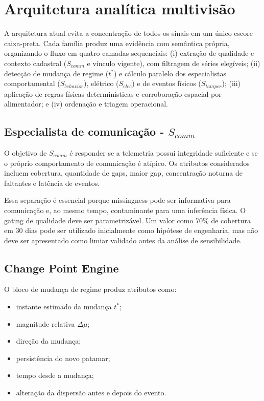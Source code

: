 \chapter{Arquitetura analítica multivisão}\label{arquitetura-analuxedtica-multivisuxe3o}

A arquitetura atual evita a concentração de todos os sinais em um único escore caixa-preta. Cada família produz uma evidência com semântica própria, organizando o fluxo em quatro camadas sequenciais: (i) extração de qualidade e contexto cadastral ($S_{comm}$ e vínculo vigente), com filtragem de séries elegíveis; (ii) detecção de mudança de regime ($t^*$) e cálculo paralelo dos especialistas comportamental ($S_{behavior}$), elétrico ($S_{elec}$) e de eventos físicos ($S_{tamper}$); (iii) aplicação de regras físicas determinísticas e corroboração espacial por alimentador; e (iv) ordenação e triagem operacional.

\section{\texorpdfstring{Especialista de comunicação - \(S_{comm}\)}{Especialista de comunicação - S\_\{comm\}}}\label{especialista-de-comunicauxe7uxe3o---s_comm}

O objetivo de \(S_{comm}\) é responder se a telemetria possui integridade suficiente e se o próprio comportamento de comunicação é atípico. Os atributos considerados incluem cobertura, quantidade de gaps, maior gap, concentração noturna de faltantes e latência de eventos.

Essa separação é essencial porque missingness pode ser informativa para comunicação e, ao mesmo tempo, contaminante para uma inferência física. O gating de qualidade deve ser parametrizável. Um valor como 70\% de cobertura em 30 dias pode ser utilizado inicialmente como hipótese de engenharia, mas não deve ser apresentado como limiar validado antes da análise de sensibilidade.

\section{Change Point Engine}\label{change-point-engine}

O bloco de mudança de regime produz atributos como:

\begin{itemize}
\item
  instante estimado da mudança \(t^*\);
\item
  magnitude relativa \(\Delta\mu\);
\item
  direção da mudança;
\item
  persistência do novo patamar;
\item
  tempo desde a mudança;
\item
  alteração da dispersão antes e depois do evento.
\end{itemize}

